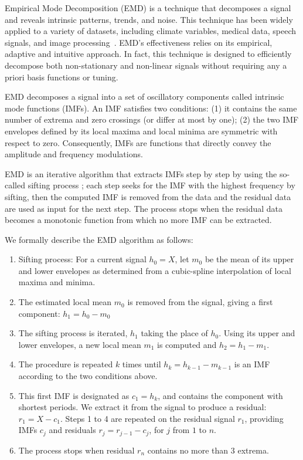 Empirical Mode Decomposition (EMD) \cite{huang:emd1998} is a technique that decomposes a signal and reveals intrinsic patterns, 
trends, and noise.
This technique has been widely applied to a variety of datasets, including climate variables\cite{climate}, medical 
data\cite{blanco:bioMed2008}, speech signals\cite{huang:signalProc2006,hasan:ieeeletter2009}, and image processing~\cite{nunes:vision2005}.
EMD's effectiveness relies on its empirical, adaptive and intuitive approach.
In fact, this technique is designed to efficiently decompose both non-stationary and non-linear signals without requiring any 
a priori basis functions or tuning.  

EMD decomposes a signal into a set of oscillatory components called intrinsic mode functions (IMFs). 
An IMF satisfies two conditions: (1) it contains the same number of extrema and zero crossings (or differ at most by one); (2) the two 
IMF envelopes defined by its local maxima and local minima are symmetric with respect to zero.  Consequently, 
 IMFs are functions that directly convey the amplitude and frequency modulations.

EMD is an iterative algorithm that extracts IMFs step by step by using the so-called sifting 
process \cite{huang:emd1998}; each step seeks for the IMF with the highest frequency by sifting, then 
the computed IMF is removed from the data and the residual data are used as input for the 
next step.
The process stops when the residual data becomes a monotonic function from which no more IMF can be extracted.

We formally describe the EMD algorithm as follows: 
\begin{enumerate}
\item Sifting process: For a current signal $h_0=X$, let $m_0$ be the mean of its upper and lower envelopes as determined from a cubic-spline interpolation of local maxima and minima.
\item The estimated local mean $m_0$ is removed from the signal, giving a first component: $h_1 = h_0-m_0$
\item The sifting process is iterated, $h_1$ taking the place of $h_0$. Using its upper and lower envelopes, a new local mean $m_1$ is computed and $h_2 = h_1-m_1$.
\item The procedure is repeated $k$ times until $h_k=h_{k-1}-m_{k-1}$ is an IMF according to the two conditions above.
\item This first IMF is designated as $c_1 = h_k$, and contains the component with shortest periods. We extract it from the signal to produce a residual: $r_1 = X - c_1$.  Steps 1 to 4 are repeated on the residual signal $r_1$, providing IMFs $c_j$ and residuals $r_j  = r_{j-1}-c_j$, for $j$ from $1$ to $n$.
\item The process stops when residual $r_n$ contains no more than 3 extrema.
\end{enumerate}

